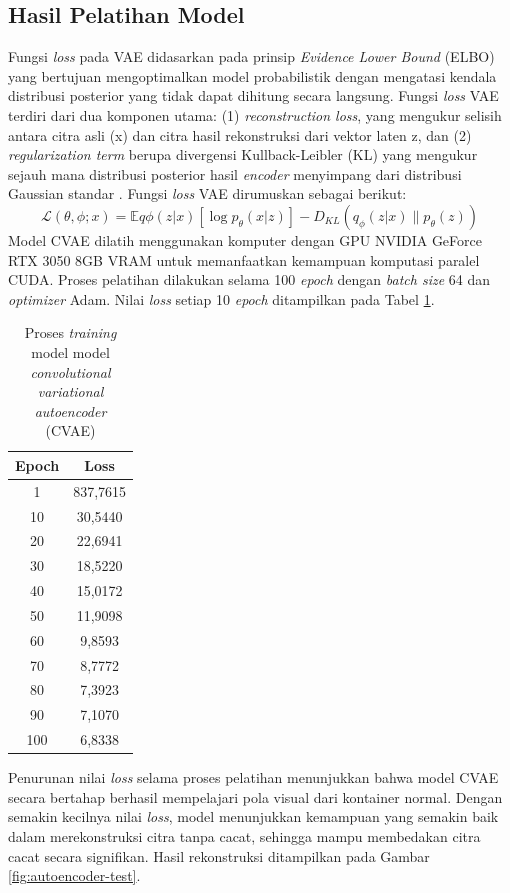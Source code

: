 \subsection{Hasil Pelatihan Model}
Fungsi \textit{loss} pada VAE didasarkan pada prinsip
\textit{Evidence Lower Bound}
(ELBO) yang bertujuan mengoptimalkan model probabilistik dengan
mengatasi kendala distribusi posterior yang tidak dapat dihitung
secara langsung. Fungsi \textit{loss} VAE terdiri dari dua komponen utama: (1)
\textit{reconstruction loss}, yang mengukur selisih antara citra asli (x) dan
citra hasil rekonstruksi dari vektor laten z, dan (2) \textit{regularization
term} berupa divergensi Kullback-Leibler (KL) yang mengukur sejauh
mana distribusi posterior hasil \textit{encoder} menyimpang dari distribusi
Gaussian standar \citep{26}. Fungsi \textit{loss} VAE dirumuskan
sebagai berikut:
\begin{equation}
  \mathcal{L}(\theta, \phi; x) = \mathbb{E}{q\phi(z|x)}[\log
  p_\theta(x|z)] - D_{KL}(q_\phi(z|x) \parallel p_\theta(z))
\end{equation}
\indent
Model CVAE dilatih
menggunakan komputer dengan GPU NVIDIA GeForce RTX 3050 8GB VRAM
untuk memanfaatkan kemampuan komputasi paralel CUDA. Proses pelatihan
dilakukan selama 100 \textit{epoch} dengan
\textit{batch size} 64
dan \textit{optimizer} Adam. Nilai \textit{loss} setiap 10
\textit{epoch} ditampilkan pada Tabel \ref{tab:training-autoencoder}.

\begin{table}[H]
  \caption{Proses \textit{training} model model \textit{convolutional
  variational autoencoder} (CVAE)}
  \label{tab:training-autoencoder}
  \vspace{-1em}
  \centering
  \begin{tabular}{cc}
    \toprule
    \textbf{Epoch} & \textbf{Loss} \\
    \midrule
    1 & 837,7615 \\
    10 & 30,5440 \\
    20 & 22,6941 \\
    30 & 18,5220 \\
    40 & 15,0172 \\
    50 & 11,9098 \\
    60 & 9,8593 \\
    70 & 8,7772 \\
    80 & 7,3923 \\
    90 & 7,1070 \\
    100 & 6,8338 \\
    \bottomrule
  \end{tabular}
\end{table}
Penurunan nilai \textit{loss} selama proses pelatihan menunjukkan bahwa model
CVAE secara bertahap berhasil mempelajari pola visual dari kontainer
normal. Dengan semakin kecilnya nilai \textit{loss}, model menunjukkan
kemampuan yang semakin baik dalam merekonstruksi citra tanpa cacat,
sehingga mampu membedakan citra cacat secara signifikan. Hasil
rekonstruksi ditampilkan pada Gambar \ref{fig:autoencoder-test}.


